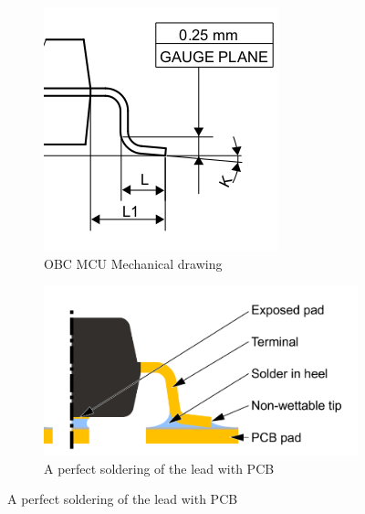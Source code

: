 \documentclass[final]{cubedoc}
\begin{document}
	
	\begin{figure}[h!]
		\centering
		\begin{subfigure}{.5\textwidth}
			\centering
			\includegraphics[width=0.7\linewidth]{docs/gullwing_leads.png}
			\caption{OBC MCU Mechanical drawing}
			\label{fig:sub1}
		\end{subfigure}%
		\begin{subfigure}{.5\textwidth}
			\centering
			\includegraphics[keepaspectratio, width=1.3\linewidth, height=.4\textheight]{docs/gullwing_solder.png}
			\caption{A perfect soldering of the lead with PCB}
			\label{fig:sub2}
		\end{subfigure}
		\label{fig:test}
	\end{figure}
	
	
\end{document}
